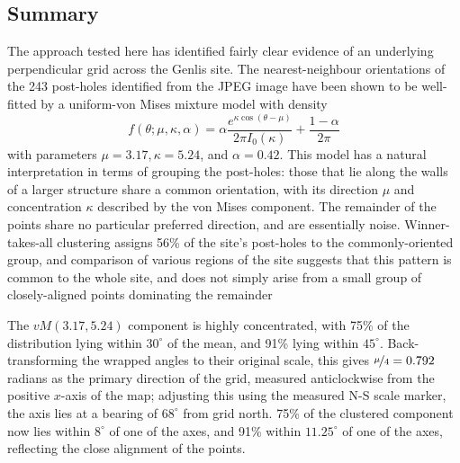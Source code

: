 \documentclass[../../ArchStats.tex]{subfiles}
\begin{document}
\subsection{Summary}

The approach tested here has identified fairly clear evidence of an underlying perpendicular grid across the Genlis site. The nearest-neighbour orientations of the  243 post-holes identified from the JPEG image have been shown to be well-fitted by  a  uniform-von Mises mixture model with density
\begin{equation}
f(\theta; \mu, \kappa, \alpha) = \alpha \frac{e^{\kappa \cos(\theta - \mu)}}{2\pi I_0(\kappa)} + \frac{1-\alpha}{2\pi}
\end{equation}
with parameters $\mu = 3.17, \kappa = 5.24$, and $\alpha =  0.42$. 
This model has a natural interpretation in terms of grouping the post-holes: those that lie along the walls of a larger structure share a common orientation, with its direction $\mu$ and concentration $\kappa$ described by the von Mises component. The remainder of the points share no particular preferred direction, and are essentially noise. Winner-takes-all clustering assigns 56\% of the site's post-holes to the commonly-oriented group, and comparison of various regions of the site suggests that this pattern is common to the whole site, and does not simply arise from a small group of closely-aligned points dominating the remainder

The $vM(3.17, 5.24)$ component is highly concentrated, with 75\% of the distribution lying within $30^\circ$ of the mean, and 91\% lying within $45^\circ$.  
Back-transforming the wrapped angles to their original scale, this gives $\nicefrac{\mu}{4} = 0.792$ radians as the primary direction of the grid, measured anticlockwise from the positive $x$-axis of the map; adjusting this using the measured N-S scale marker, the axis lies at a bearing of $68^\circ$ from grid north. 75\% of the clustered component now lies within $8^\circ$ of one of the axes, and 91\% within $11.25^\circ$ of one of the axes, reflecting the close alignment of the points.
\end{document}

